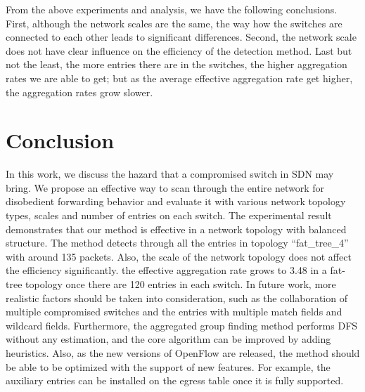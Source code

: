 \documentclass[conference]{IEEEtran}
\begin{document}
From the above experiments and analysis, we have the following conclusions. First, although the network scales are the same, the way how the switches are connected to each other leads to significant differences. Second, the network scale does not have clear influence on the efficiency of the detection method. Last but not the least, the more entries there are in the switches, the higher aggregation rates we are able to get; but as the average effective aggregation rate get higher, the aggregation rates grow slower. 

\section{Conclusion}
\label{conclusion}
In this work, we discuss the hazard that a compromised switch in SDN may bring. We propose an effective way to scan through the entire network for disobedient forwarding behavior and evaluate it with various network topology types, scales and number of entries on each switch. The experimental result demonstrates that our method is effective in a network topology with balanced structure. The method detects through all the entries in topology ``fat\_tree\_4'' with around 135 packets. Also, the scale of the network topology does not affect the efficiency significantly. the effective aggregation rate grows to 3.48 in a fat-tree topology once there are 120 entries in each switch. In future work, more realistic factors should be taken into consideration, such as the collaboration of multiple compromised switches and the entries with multiple match fields and wildcard fields. Furthermore, the aggregated group finding method performs DFS without any estimation, and the core algorithm can be improved by adding heuristics. Also, as the new versions of OpenFlow are released, the method should be able to be optimized with the support of new features. For example, the auxiliary entries can be installed on the egress table once it is fully supported.


\end{document}
